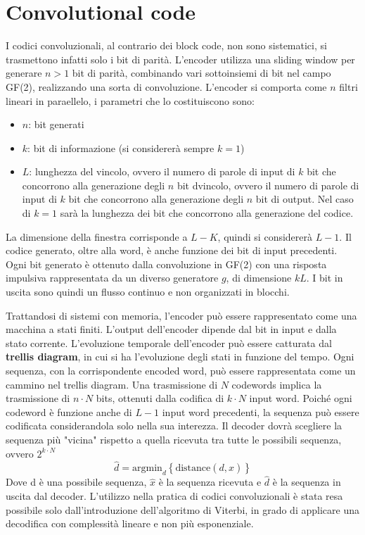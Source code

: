 \section*{Convolutional code}

I codici convoluzionali, al contrario dei block code, non sono sistematici, si trasmettono infatti solo i bit di parità.
L'encoder utilizza una sliding window per generare $n>1$ bit di parità, combinando vari sottoinsiemi di bit nel campo GF(2), realizzando una sorta di convoluzione.
L'encoder si comporta come $n$ filtri lineari in paraellelo, i parametri che lo costituiscono sono:
\begin{itemize}
    \item $n$: bit generati
    \item $k$: bit di informazione (si considererà sempre $k=1$)
    \item $L$: lunghezza del vincolo, ovvero il numero di parole di input di $k$ bit che concorrono alla generazione degli $n$ bit dvincolo, ovvero il numero di parole di input di $k$ bit che concorrono alla generazione degli $n$ bit di output. Nel caso di $k=1$ sarà la lunghezza dei bit che concorrono alla generazione del codice.
\end{itemize}

La dimensione della finestra corrisponde a $L-K$, quindi si considererà $L-1$. Il codice generato, oltre alla word, è anche funzione dei bit di input precedenti. Ogni bit generato è ottenuto dalla convoluzione in GF(2) con una risposta impulsiva rappresentata da un diverso generatore $g$, di dimensione $kL$.
I bit in uscita sono quindi un flusso continuo e non organizzati in blocchi.

Trattandosi di sistemi con memoria, l'encoder può essere rappresentato come una macchina a stati finiti.
L'output dell'encoder dipende dal bit in input e dalla stato corrente.
L'evoluzione temporale dell'encoder può essere catturata dal \textbf{trellis diagram}, in cui si ha l'evoluzione degli stati in funzione del tempo.
Ogni sequenza, con la corrispondente encoded word, può essere rappresentata come un cammino nel trellis diagram.
Una trasmissione di $N$ codewords implica la trasmissione di $n \cdot N$ bits, ottenuti dalla codifica di $k \cdot N$ input word.
Poiché ogni codeword è funzione anche di $L-1$ input word precedenti, la sequenza può essere codificata considerandola solo nella sua interezza. 
Il decoder dovrà scegliere la sequenza più "vicina" rispetto a quella ricevuta tra tutte le possibili sequenza, ovvero $2^{k \cdot N}$
\[
    \hat{d} = \text{argmin}_d \left\{\text{distance}(d, \hat{x})\right\}
\]
Dove d è una possibile sequenza, $\hat{x}$ è la sequenza ricevuta e $\hat{d}$ è la sequenza in uscita dal decoder.
L'utilizzo nella pratica di codici convoluzionali è stata resa possibile solo dall'introduzione dell'algoritmo di Viterbi, in grado di applicare una decodifica con complessità lineare e non più esponenziale.

